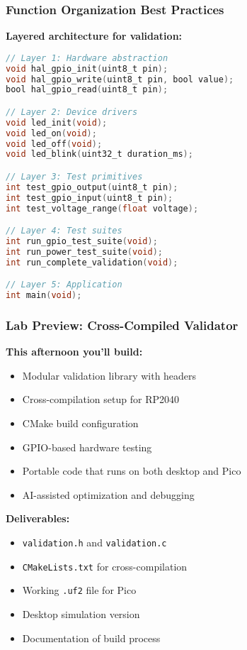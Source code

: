 \documentclass{beamer}
\begin{document}
\begin{frame}[fragile]
\frametitle{Function Organization Best Practices}
\textbf{Layered architecture for validation:}
\begin{lstlisting}[language=C]
// Layer 1: Hardware abstraction
void hal_gpio_init(uint8_t pin);
void hal_gpio_write(uint8_t pin, bool value);
bool hal_gpio_read(uint8_t pin);

// Layer 2: Device drivers
void led_init(void);
void led_on(void);
void led_off(void);
void led_blink(uint32_t duration_ms);

// Layer 3: Test primitives
int test_gpio_output(uint8_t pin);
int test_gpio_input(uint8_t pin);
int test_voltage_range(float voltage);

// Layer 4: Test suites
int run_gpio_test_suite(void);
int run_power_test_suite(void);
int run_complete_validation(void);

// Layer 5: Application
int main(void);
\end{lstlisting}
\end{frame}

\begin{frame}
\frametitle{Lab Preview: Cross-Compiled Validator}
\textbf{This afternoon you'll build:}
\begin{itemize}
    \item Modular validation library with headers
    \item Cross-compilation setup for RP2040
    \item CMake build configuration
    \item GPIO-based hardware testing
    \item Portable code that runs on both desktop and Pico
    \item AI-assisted optimization and debugging
\end{itemize}

\vspace{0.5cm}
\textbf{Deliverables:}
\begin{itemize}
    \item \texttt{validation.h} and \texttt{validation.c}
    \item \texttt{CMakeLists.txt} for cross-compilation
    \item Working \texttt{.uf2} file for Pico
    \item Desktop simulation version
    \item Documentation of build process
\end{itemize}
\end{frame}
\end{document}
